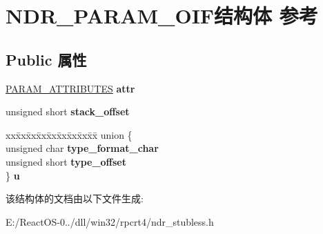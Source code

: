 \hypertarget{struct_n_d_r___p_a_r_a_m___o_i_f}{}\section{N\+D\+R\+\_\+\+P\+A\+R\+A\+M\+\_\+\+O\+I\+F结构体 参考}
\label{struct_n_d_r___p_a_r_a_m___o_i_f}
\subsection*{Public 属性}
\begin{DoxyCompactItemize}
\item 
\mbox{\label{struct_n_d_r___p_a_r_a_m___o_i_f_abb08d538671709904737857e877e4edf}} 
\hyperlink{struct_p_a_r_a_m___a_t_t_r_i_b_u_t_e_s}{P\+A\+R\+A\+M\+\_\+\+A\+T\+T\+R\+I\+B\+U\+T\+ES} {\bfseries attr}
\item 
\mbox{\label{struct_n_d_r___p_a_r_a_m___o_i_f_aa57ba3580b8f7db89f55e803522018a5}} 
unsigned short {\bfseries stack\+\_\+offset}
\item 
\mbox{\label{struct_n_d_r___p_a_r_a_m___o_i_f_aeda25d601ebe5a150913c1b307c6df4d}} 
\begin{tabbing}
xx\=xx\=xx\=xx\=xx\=xx\=xx\=xx\=xx\=\kill
union \{\\
\>unsigned char {\bfseries type\_format\_char}\\
\>unsigned short {\bfseries type\_offset}\\
\} {\bfseries u}\\

\end{tabbing}\end{DoxyCompactItemize}


该结构体的文档由以下文件生成\+:\begin{DoxyCompactItemize}
\item 
E\+:/\+React\+O\+S-\/0../dll/win32/rpcrt4/ndr\+\_\+stubless.\+h\end{DoxyCompactItemize}
